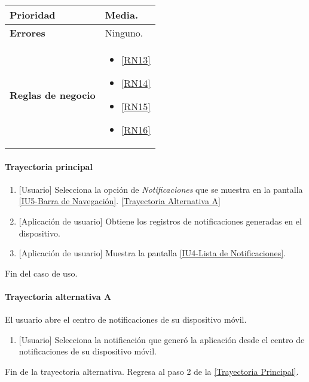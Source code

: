 \begin{longtable}{|J{5cm}|J{10.3cm}|}
		\\ \hline 
	\textbf{Prioridad} & 
		Media. \\ \hline
	\textbf{Errores} & Ninguno. 
		\\ \hline
	\textbf{Reglas de negocio} & 
		\begin{itemize}
		 	\item \ref{RN13}
		 	\item \ref{RN14}
		 	\item \ref{RN15}
		 	\item \ref{RN16}
		\end{itemize}
		 \\ \hline
\end{longtable}

\paragraph{Trayectoria principal} \label{SUB-U-CU1.6:TP}
	\begin{enumerate}
		\item {[Usuario]} Selecciona la opción de \textit{Notificaciones} que se muestra en la pantalla  \hyperref[fig:Barra de navegacion]{[IU5-Barra de Navegación]}. \hyperref[SUB-U-CU1.6:TA]{[Trayectoria Alternativa A]}
		\item {[Aplicación de usuario]} Obtiene los registros de notificaciones generadas en el dispositivo.
		\item {[Aplicación de usuario]} Muestra la pantalla \hyperref[fig:Lista de Notificaciones]{[IU4-Lista de Notificaciones]}.
	\end{enumerate}
	Fin del caso de uso.

\paragraph{Trayectoria alternativa A} \label{SUB-U-CU1.6:TA}
 	El usuario abre el centro de notificaciones de su dispositivo móvil.
 	\begin{enumerate}[label=A\arabic*.]
 	    \item {[Usuario]} Selecciona la notificación que generó la aplicación desde el centro de notificaciones de su dispositivo móvil.
 	\end{enumerate}
 	Fin de la trayectoria alternativa. Regresa al paso 2 de la \hyperref[SUB-U-CU1.6:TP]{[Trayectoria Principal]}.
